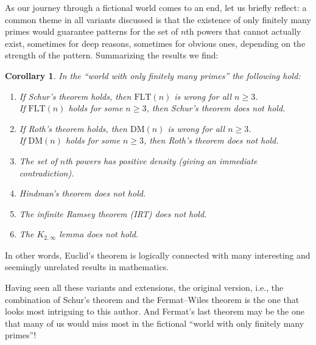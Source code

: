 \documentclass{article}
\theoremstyle{theorem}
\newtheorem{corollary}{Corollary}
\theoremstyle{definition}
\newcommand{\FLT}{\mathrm{FLT}}
\newcommand{\DM}{\mathrm{DM}}
\begin{document}
As our journey through a fictional world comes to an end, 
let us briefly reflect:
a common theme in all variants discussed is that the existence of only 
finitely many
primes would guarantee patterns for the set of $n$th powers that cannot
actually exist, sometimes for deep reasons, 
sometimes for obvious ones, depending on
the strength of the pattern.
Summarizing the results we find:
\begin{corollary}
In the ``world with only finitely many primes'' the following hold:
\begin{enumerate}
\item
If Schur's theorem holds, then $\FLT(n)$ is wrong for all $n \geq 3$.\\
If $\FLT(n)$ holds for some $n \geq 3$, then Schur's theorem does not hold. 
\item If Roth's theorem holds, then $\DM(n)$ is wrong for all $n \geq 3$.\\
If $\DM(n)$ holds for some $n \geq 3$, then Roth's theorem does not hold. 
\item The set of $n$th powers has positive density
  (giving an immediate contradiction).
\item Hindman's theorem does not hold.
\item The infinite Ramsey theorem (IRT) does not hold.
\item The $K_{2, \infty}$ lemma does not hold.
\end{enumerate}
\end{corollary}
In other words, Euclid's theorem is logically connected
with many interesting and seemingly unrelated results in mathematics.

Having seen all these variants and extensions, the original version, 
i.e., the combination of Schur's
theorem and the Fermat--Wiles theorem is the one that
looks most intriguing to this author. And Fermat's last theorem
may be the one that many of us
would miss most in the fictional ``world with only finitely many primes''!
\end{document}
